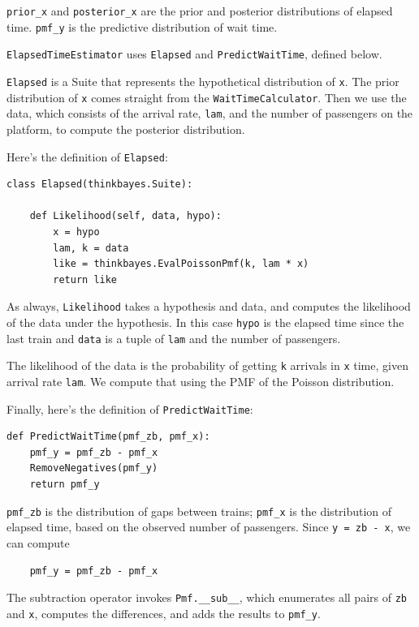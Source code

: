 \documentclass[12pt]{book}
\begin{document}
\verb"prior_x" and \verb"posterior_x" are the prior and
posterior distributions of elapsed time.  \verb"pmf_y" is
the predictive distribution of wait time.

{\tt ElapsedTimeEstimator} uses {\tt Elapsed} and {\tt PredictWaitTime},
defined below.

{\tt Elapsed} is a Suite that represents the hypothetical
distribution of {\tt x}.  The prior distribution of {\tt x}
comes straight from the {\tt WaitTimeCalculator}.  Then we
use the data, which consists of the arrival rate, {\tt lam},
and the number of passengers on the platform, to compute
the posterior distribution.

Here's the definition of {\tt Elapsed}:

\begin{verbatim}
class Elapsed(thinkbayes.Suite):

    def Likelihood(self, data, hypo):
        x = hypo
        lam, k = data
        like = thinkbayes.EvalPoissonPmf(k, lam * x)
        return like
\end{verbatim}

As always, {\tt Likelihood} takes a hypothesis and data, and
computes the likelihood of the data under the hypothesis.
In this case {\tt hypo} is the elapsed time since the last train
and {\tt data} is a tuple of {\tt lam} and the number of
passengers.

The likelihood of the data is the probability of getting
{\tt k} arrivals in {\tt x} time, given arrival rate
{\tt lam}.  We compute that using the PMF of the Poisson
distribution.

Finally, here's the definition of {\tt PredictWaitTime}:

\begin{verbatim}
def PredictWaitTime(pmf_zb, pmf_x):
    pmf_y = pmf_zb - pmf_x
    RemoveNegatives(pmf_y)
    return pmf_y
\end{verbatim}

\verb"pmf_zb" is the distribution of gaps between trains;
\verb"pmf_x" is the distribution of elapsed time, based on
the observed number of passengers.  Since {\tt y = zb - x},
we can compute

\begin{verbatim}
    pmf_y = pmf_zb - pmf_x
\end{verbatim}

The subtraction operator invokes \verb"Pmf.__sub__", which enumerates
all pairs of {\tt zb} and {\tt x}, computes the differences, and adds
the results to \verb"pmf_y".
\end{document}
